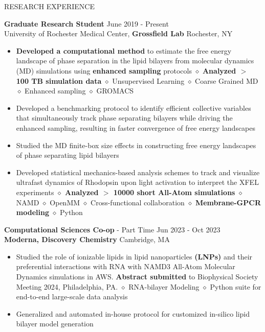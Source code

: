 \documentclass{resume} %
\begin{document}
\begin{rSection}{RESEARCH EXPERIENCE}

   \textbf{Graduate Research Student} \hfill June 2019 - Present\\
   University of Rochester Medical Center, \textbf{Grossfield Lab} \hfill Rochester, NY
   \begin{itemize}
      \itemsep -1pt {}
      \item \textbf{Developed a computational method} to estimate the free energy landscape of phase separation in the lipid bilayers from molecular dynamics (MD) simulations using \textbf{enhanced sampling} protocols
            $\diamond$ \textbf{Analyzed $>$ 100 TB simulation data} $\diamond$ Unsupervised Learning $\diamond$ Coarse Grained MD $\diamond$ Enhanced sampling $\diamond$ GROMACS
      \item Developed a benchmarking protocol to identify efficient collective variables that simultaneously track phase separating bilayers while driving the enhanced sampling, resulting in faster convergence of free energy landscapes
      \item Studied the MD finite-box size effects in constructing free energy landscapes of phase separating lipid bilayers
      \item Developed statistical mechanics-based analysis schemes to track and visualize ultrafast dynamics of Rhodopsin upon light activation to interpret the XFEL experiments \textbf{$\diamond$ Analyzed $>$ 10000 short All-Atom simulations}
            $\diamond$ NAMD $\diamond$ OpenMM $\diamond$ Cross-functional collaboration $\diamond$  \textbf{Membrane-GPCR modeling} $\diamond$ Python
   \end{itemize}

   \textbf{Computational Sciences Co-op} - Part Time \hfill Jun 2023 - Oct 2023\\
   \textbf{Moderna, Discovery Chemistry} \hfill {Cambridge, MA}
   \begin{itemize}
      \itemsep -1pt {}
      \item Studied the role of ionizable lipids in lipid nanoparticles \textbf{(LNPs)} and their preferential interactions with RNA with NAMD3 All-Atom Molecular Dynamics simulations in AWS.
            \textbf{Abstract submitted} to Biophysical Society Meeting 2024, Philadelphia, PA.
            $\diamond$ RNA-bilayer Modeling $\diamond$ Python suite for end-to-end large-scale data analysis
      \item Generalized and automated in-house protocol for customized in-silico lipid bilayer model generation
   \end{itemize}


\end{rSection}
\end{document}
